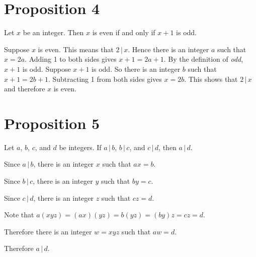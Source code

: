 \documentclass[12pt]{article}
\begin{document}
\section*{Proposition 4}
Let $x$ be an integer. Then $x$ is even if and only if $x+1$ is odd.

Suppose $x$ is even. This means that $2\,|\,x$. Hence there is an integer $a$ such that $x=2a$. Adding 1 to both sides gives $x+1=2a+1$. By the definition of \textit{odd}, $x+1$ is odd.
Suppose $x+1$ is odd. So there is an integer $b$ such that $x+1=2b+1$. Subtracting 1 from both sides gives $x=2b$. This shows that $2\,|\,x$ and therefore $x$ is even.
\section*{Proposition 5}
Let $a$, $b$, $c$, and $d$ be integers. If $a\,|\,b$, $b\,|\,c$, and $c\,|\,d$, then $a\,|\,d$.

Since $a\,|\,b$, there is an integer $x$ such that $ax=b$.

Since $b\,|\,c$, there is an integer $y$ such that $by=c$.

Since $c\,|\,d$, there is an integer $z$ such that $cz=d$.

Note that $a(xyz)=(ax)(yz)=b(yz)=(by)z=cz=d$.

Therefore there is an integer $w=xyz$ such that $aw=d$.

Therefore $a\,|\,d$.
\end{document}
